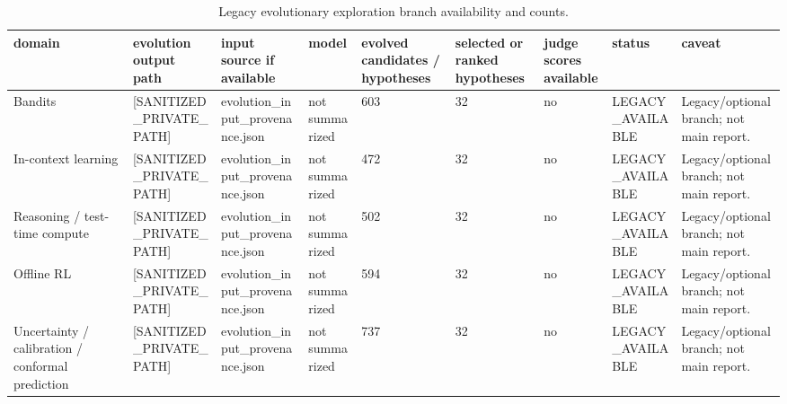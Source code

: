 \begin{table}[htbp]
\centering
\caption{Legacy evolutionary exploration branch availability and counts.}
\label{tab:evolutionary\_exploration}
\begin{tabular}{lllllllll}
\toprule
domain & evolution output path & input source if available & model & evolved candidates / hypotheses & selected or ranked hypotheses & judge scores available & status & caveat \\
\midrule
Bandits & [SANITIZED_PRIVATE_PATH] & evolution\_input\_provenance.json & not summarized & 603 & 32 & no & LEGACY\_AVAILABLE & Legacy/optional branch; not main report. \\
In-context learning & [SANITIZED_PRIVATE_PATH] & evolution\_input\_provenance.json & not summarized & 472 & 32 & no & LEGACY\_AVAILABLE & Legacy/optional branch; not main report. \\
Reasoning / test-time compute & [SANITIZED_PRIVATE_PATH] & evolution\_input\_provenance.json & not summarized & 502 & 32 & no & LEGACY\_AVAILABLE & Legacy/optional branch; not main report. \\
Offline RL & [SANITIZED_PRIVATE_PATH] & evolution\_input\_provenance.json & not summarized & 594 & 32 & no & LEGACY\_AVAILABLE & Legacy/optional branch; not main report. \\
Uncertainty / calibration / conformal prediction & [SANITIZED_PRIVATE_PATH] & evolution\_input\_provenance.json & not summarized & 737 & 32 & no & LEGACY\_AVAILABLE & Legacy/optional branch; not main report. \\
\bottomrule
\end{tabular}
\end{table}
